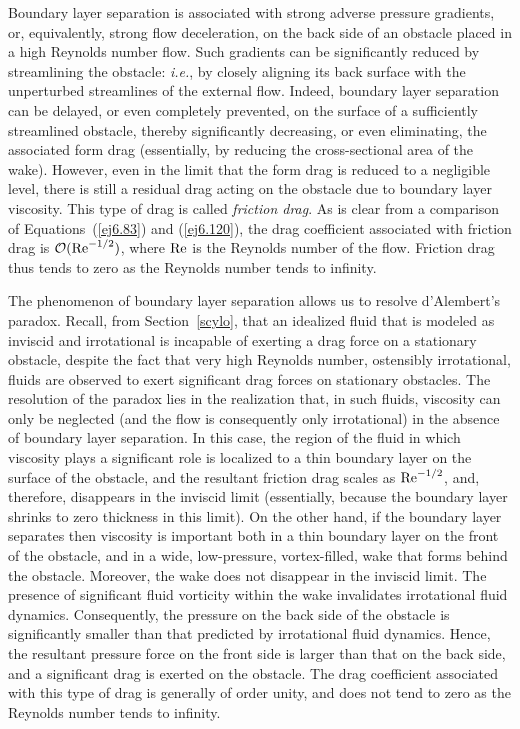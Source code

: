 Boundary layer separation is associated with strong adverse pressure gradients, or, equivalently,  strong flow deceleration, on the
back side of an obstacle placed in a high Reynolds number flow. Such gradients can be significantly reduced by streamlining the obstacle: {\em i.e.}, 
by closely aligning its back surface with the unperturbed streamlines of the external flow. Indeed, boundary
layer separation can be delayed, or even completely prevented, on the surface of a sufficiently streamlined
obstacle, thereby significantly decreasing, or even eliminating, the associated form drag (essentially, by reducing the cross-sectional area of the wake). However, even in the limit that the form drag 
is reduced to a negligible level, there is still a residual drag acting on the obstacle due to boundary layer viscosity. 
This type of drag is called {\em friction drag}. As is clear from a comparison of Equations~(\ref{ej6.83}) and
(\ref{ej6.120}), the drag coefficient associated with friction drag is ${\cal O}({\rm Re}^{-1/2})$, where ${\rm Re}$ is the
Reynolds number of the flow.  Friction drag thus tends
to zero as the Reynolds number tends to infinity. 

The phenomenon of boundary layer separation  allows us to resolve d'Alembert's paradox. Recall, from
Section~\ref{scylo}, that an idealized fluid that is modeled as  inviscid and irrotational  is incapable of exerting a drag force on a stationary
obstacle, despite the fact that very high Reynolds number, ostensibly irrotational, fluids are observed to exert significant drag forces
on stationary obstacles. The resolution of the paradox lies in the realization that, in such fluids, viscosity can only be neglected (and the
flow is consequently only irrotational) 
 in the absence of boundary layer separation. In this case, the region of the fluid in which viscosity
plays a significant role is localized to a thin boundary layer on the surface of the obstacle, and the resultant
friction drag scales as ${\rm Re}^{-1/2}$, and, therefore, disappears in the inviscid limit (essentially,
because the boundary layer shrinks to zero thickness in this limit). On the other hand, 
if the boundary layer separates then viscosity is important both in a thin boundary layer on the front
of the obstacle, and in a wide,  low-pressure, vortex-filled, wake that forms behind the obstacle. Moreover, the
wake does not disappear in the inviscid limit.
The presence of significant fluid vorticity within the wake invalidates  irrotational fluid dynamics.
Consequently, the  pressure on the back side of the obstacle is significantly smaller than that
predicted by irrotational fluid dynamics. Hence, the resultant pressure force
on the front side is larger than that on the back side, and a significant drag is exerted on the obstacle.
The drag coefficient associated with this type of drag is generally of order unity, and does not tend to zero
as the Reynolds number tends to infinity. 

